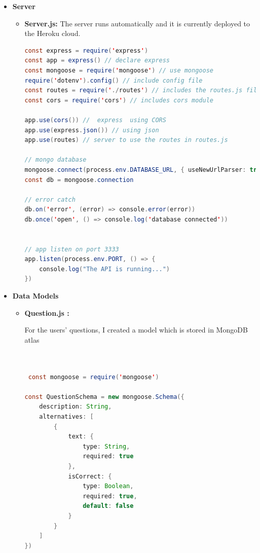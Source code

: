 \begin{itemize}
\item\textbf{Server} 

\begin{itemize}
     \item\textbf{Server.js:} The server runs automatically and it is currently deployed to the Heroku cloud.



\begin{lstlisting}[language=Java, caption= Server.js Code Stubs ]
const express = require('express')
const app = express() // declare express
const mongoose = require('mongoose') // use mongoose 
require('dotenv').config() // include config file
const routes = require('./routes') // includes the routes.js file
const cors = require('cors') // includes cors module

app.use(cors()) //  express  using CORS
app.use(express.json()) // using json 
app.use(routes) // server to use the routes in routes.js

// mongo database 
mongoose.connect(process.env.DATABASE_URL, { useNewUrlParser: true, useUnifiedTopology: true })
const db = mongoose.connection

// error catch
db.on('error', (error) => console.error(error))
db.once('open', () => console.log('database connected'))


// app listen on port 3333
app.listen(process.env.PORT, () => {
    console.log("The API is running...")
})

\end{lstlisting}

   \end{itemize}

\item\textbf{Data Models} 

 \begin{itemize}
 
 \item\textbf{Question.js :}
 
 For the users' questions, I created a model which is stored in MongoDB atlas
 

 
 \begin{lstlisting}[language=Java, caption= Question.js Code Stubs ]

 
 const mongoose = require('mongoose')

const QuestionSchema = new mongoose.Schema({
    description: String,
    alternatives: [
        {
            text: {
                type: String,
                required: true
            },
            isCorrect: {
                type: Boolean,
                required: true,
                default: false
            }
        }
    ]
})


\end{lstlisting}
\end{itemize}
\end{itemize}
